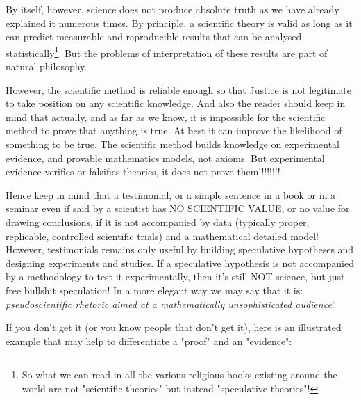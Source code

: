 	By itself, however, science does not produce absolute truth as we have already explained it numerous times. By principle, a scientific theory is valid as long as it can predict measurable and reproducible results that can be analysed statistically\footnote{So what we can read in all the various religious books existing around the world are not "scientific theories" but instead "speculative theories"!}. But the problems of interpretation of these results are part of natural philosophy.
	\begin{center}
	\end{center}
	However, the scientific method is reliable enough so that Justice is not legitimate to take position on any scientific knowledge. And also the reader should keep in mind that actually, and as far as we know, it is impossible for the scientific method to prove that anything is true. At best it can improve the likelihood of something to be true. The scientific method builds knowledge on experimental evidence, and provable mathematics models, not axioms. But experimental evidence verifies or falsifies theories, it does not prove them!!!!!!!!
	
	\begin{tcolorbox}[title=Remark,arc=10pt,breakable,drop lifted shadow,
  skin=enhanced,
  skin first is subskin of={enhancedfirst}{arc=10pt,no shadow},
  skin middle is subskin of={enhancedmiddle}{arc=10pt,no shadow},
  skin last is subskin of={enhancedlast}{drop lifted shadow}]
	Hence keep in mind that a testimonial, or a simple sentence in a book or in a seminar even if said by a scientist has NO SCIENTIFIC VALUE, or no value for drawing conclusions, if it is not accompanied by data (typically proper, replicable, controlled scientific trials) and a mathematical detailed model! However, testimonials remains only useful by building speculative hypotheses and designing experiments and studies. If a speculative hypothesis is not accompanied by a methodology to test it experimentally, then it's still NOT science, but just free bullshit speculation! In a more elegant way we may say that it is: \textit{pseudoscientific rhetoric aimed at a mathematically unsophisticated audience}!
	\end{tcolorbox}
	If you don't get it (or you know people that don't get it), here is an illustrated example that may help to differentiate a "proof" and an "evidence":
	
